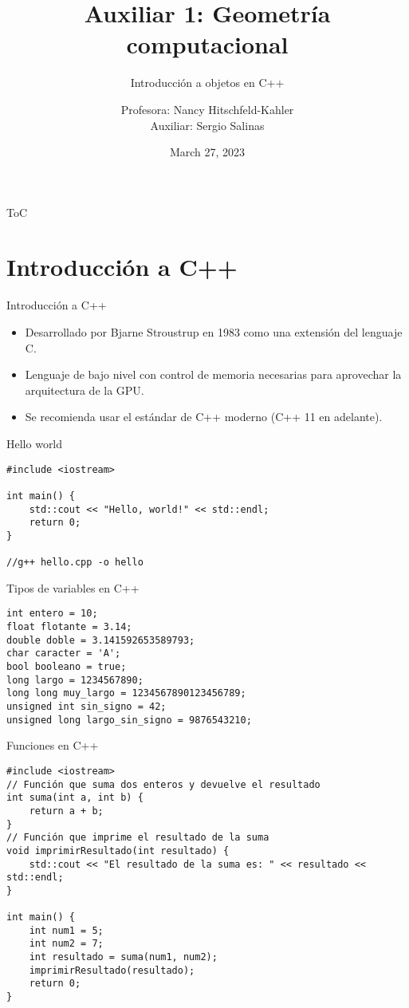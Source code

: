 \documentclass{beamer}
\title[Auxiliar 1]{Auxiliar 1: Geometría computacional}
\subtitle{Introducción a objetos en C++}
\author[Computación GPU]{Profesora: Nancy Hitschfeld-Kahler \\ Auxiliar: Sergio Salinas}
\institute[DCC - UChile]{CC7515 - Computación en GPU}
\date{March 27, 2023}
\begin{document}
\begin{frame}
  \titlepage
\end{frame}

\begin{frame}{ToC}
    \tableofcontents
\end{frame}

\section{Introducción a C++}

\begin{frame}{Introducción a C++}
    \begin{itemize}
        \item Desarrollado por Bjarne Stroustrup en 1983 como una extensión del lenguaje C.
        \item Lenguaje de bajo nivel con control de memoria necesarias para aprovechar la arquitectura de la GPU.
        \item Se recomienda usar el estándar de C++ moderno (C++ 11 en adelante).
    \end{itemize}
\end{frame}

\begin{frame}[fragile]{Hello world}

\begin{verbatim}
#include <iostream>

int main() {
    std::cout << "Hello, world!" << std::endl;
    return 0;
}

//g++ hello.cpp -o hello
\end{verbatim}

\end{frame}

\begin{frame}[fragile]{Tipos de variables en C++}
\begin{verbatim}
int entero = 10;
float flotante = 3.14;
double doble = 3.141592653589793;
char caracter = 'A';
bool booleano = true;
long largo = 1234567890;
long long muy_largo = 1234567890123456789;
unsigned int sin_signo = 42;
unsigned long largo_sin_signo = 9876543210;
\end{verbatim}
\end{frame}

\begin{frame}[fragile]{Funciones en C++}
\begin{verbatim}
#include <iostream>
// Función que suma dos enteros y devuelve el resultado
int suma(int a, int b) {
    return a + b;
}
// Función que imprime el resultado de la suma
void imprimirResultado(int resultado) {
    std::cout << "El resultado de la suma es: " << resultado << std::endl;
}

int main() {
    int num1 = 5;
    int num2 = 7;
    int resultado = suma(num1, num2);
    imprimirResultado(resultado);
    return 0;
}
\end{verbatim}
\end{frame}
\end{document}
